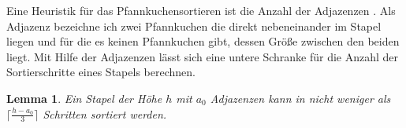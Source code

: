 \documentclass[a4paper,10pt,ngerman]{scrartcl}
\newtheorem{lemma}[theorem]{Lemma}
\begin{document}
\begin{algorithmic}
  \EndIf
  \EndIf
  \EndFor
  \EndWhile
  \EndProcedure
\end{algorithmic}
Eine Heuristik für das Pfannkuchensortieren ist die Anzahl der Adjazenzen \cite{gates_1979}. Als Adjazenz bezeichne ich zwei
Pfannkuchen die direkt nebeneinander im Stapel liegen und für die es keinen Pfannkuchen gibt, dessen Größe zwischen den beiden liegt.
Mit Hilfe der Adjazenzen lässt sich eine untere Schranke für die Anzahl der Sortierschritte eines Stapels berechnen.
\begin{lemma}
  Ein Stapel der Höhe $h$ mit $a_0$ Adjazenzen kann in nicht weniger als $\lceil\frac{h - a_0}{3}\rceil$ Schritten sortiert werden.
\end{lemma}
\end{document}
